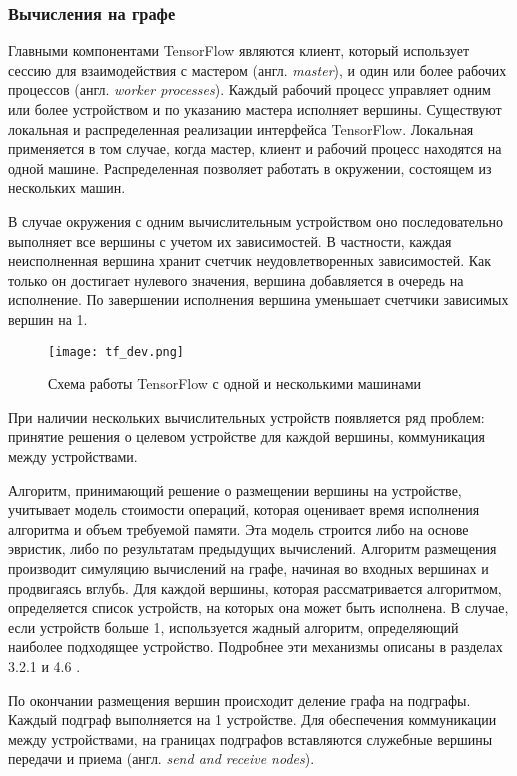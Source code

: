 \subsubsection{Вычисления на графе}

Главными компонентами TensorFlow являются клиент, который использует сессию
для взаимодействия с мастером (англ. \textit{master}), и один или более
рабочих процессов (англ. \textit{worker processes}). Каждый рабочий процесс
управляет одним или более устройством и по указанию мастера исполняет вершины.
Существуют локальная и распределенная реализации интерфейса TensorFlow.
Локальная применяется в том случае, когда мастер, клиент и рабочий процесс
находятся на одной машине. Распределенная позволяет работать в окружении,
состоящем из нескольких машин.

В случае окружения с одним вычислительным устройством оно последовательно
выполняет все вершины с учетом их зависимостей. В частности, каждая
неисполненная вершина хранит счетчик неудовлетворенных зависимостей. Как только
он достигает нулевого значения, вершина добавляется в очередь на исполнение.
По завершении исполнения вершина уменьшает счетчики зависимых вершин на 1.

\begin{figure}[h]
    \centering
    \texttt{[image: tf\_dev.png]}
    \caption{Схема работы TensorFlow с одной и несколькими машинами}
    \label{fig:tf_dev}
\end{figure}

При наличии нескольких вычислительных устройств появляется ряд проблем: принятие
решения о целевом устройстве для каждой вершины, коммуникация между устройствами.

Алгоритм, принимающий решение о размещении вершины на устройстве, учитывает
модель стоимости операций, которая оценивает время исполнения алгоритма и
объем требуемой памяти. Эта модель строится либо на основе эвристик, либо
по результатам предыдущих вычислений. Алгоритм размещения производит симуляцию
вычислений на графе, начиная во входных вершинах и продвигаясь вглубь. Для
каждой вершины, которая рассматривается алгоритмом, определяется список устройств,
на которых она может быть исполнена. В случае, если устройств больше 1,
используется жадный алгоритм, определяющий наиболее подходящее устройство.
Подробнее эти механизмы описаны в разделах 3.2.1 и 4.6 \cite{Abadi2016}.

По окончании размещения вершин происходит деление графа на подграфы. Каждый
подграф выполняется на 1 устройстве. Для обеспечения коммуникации между
устройствами, на границах подграфов вставляются служебные вершины передачи и
приема (англ. \textit{send and receive nodes}).

